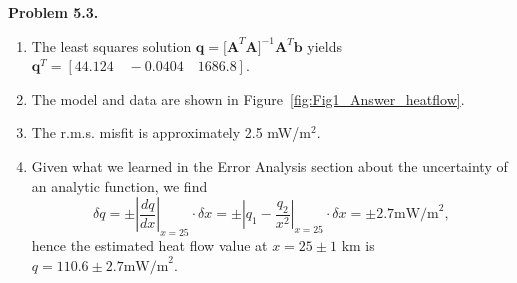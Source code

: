 \noindent
\bf{Problem 5.3.} \\
\begin{enumerate}[label=\alph*)]
\item The least squares solution $\mathbf{q = [A}^T\mathbf{A]}^{-1}\mathbf{A}^T\mathbf{b}$ yields
$\mathbf{q}^T = [ 44.124 \quad -0.0404 \quad 1686.8 ]$.
\item The model and data are shown in Figure~\ref{fig:Fig1_Answer_heatflow}.

\item The r.m.s. misfit is approximately 2.5 mW/m$^2$.
\item Given what we learned in the Error Analysis section about the uncertainty of an analytic function, we find
\[
\delta q = \pm \left | \frac{dq}{dx} \right |_{x=25} \cdot \delta x = \pm \left | q_1 - \frac{q_2}{x^2} \right |_{x=25} \cdot \delta x = \pm 2.7 \mbox{mW/m}^2,
\]
hence the estimated heat flow value at $x = 25 \pm 1$ km is $q = 110.6 \pm 2.7 \mbox{mW/m}^2$.
\end{enumerate}


